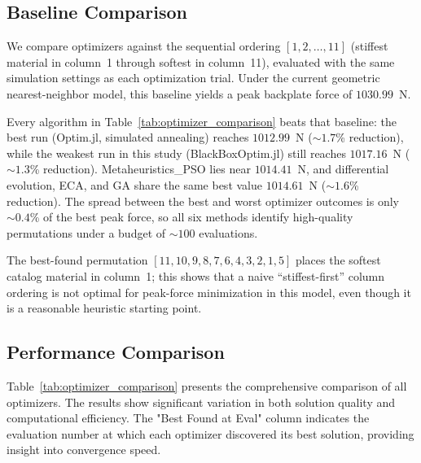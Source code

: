 \documentclass[11pt,a4paper]{article}
\begin{document}
\subsection{Baseline Comparison}

\noindent We compare optimizers against the sequential ordering $[1, 2, \ldots, 11]$ (stiffest material in column~1 through softest in column~11), evaluated with the same simulation settings as each optimization trial. Under the current geometric nearest-neighbor model, this baseline yields a peak backplate force of $1030.99$~N. \newline

\noindent Every algorithm in Table~\ref{tab:optimizer_comparison} beats that baseline: the best run (Optim.jl, simulated annealing) reaches $1012.99$~N ($\sim 1.7$\% reduction), while the weakest run in this study (BlackBoxOptim.jl) still reaches $1017.16$~N ($\sim 1.3$\% reduction). Metaheuristics\_PSO lies near $1014.41$~N, and differential evolution, ECA, and GA share the same best value $1014.61$~N ($\sim 1.6$\% reduction). The spread between the best and worst optimizer outcomes is only $\sim 0.4$\% of the best peak force, so all six methods identify high-quality permutations under a budget of $\sim 100$ evaluations. \newline

\noindent The best-found permutation $[11, 10, 9, 8, 7, 6, 4, 3, 2, 1, 5]$ places the softest catalog material in column~1; this shows that a naive ``stiffest-first'' column ordering is not optimal for peak-force minimization in this model, even though it is a reasonable heuristic starting point.

\subsection{Performance Comparison}

\noindent Table~\ref{tab:optimizer_comparison} presents the comprehensive comparison of all optimizers. The results show significant variation in both solution quality and computational efficiency. The "Best Found at Eval" column indicates the evaluation number at which each optimizer discovered its best solution, providing insight into convergence speed.
\end{document}
